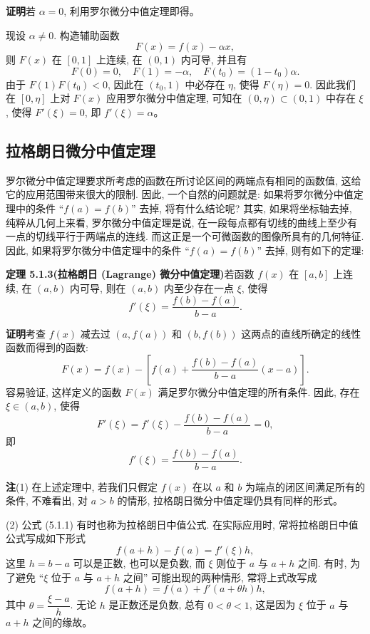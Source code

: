 \documentclass[UTF8, 12pt, fontset=fandol, oneside]{ctexart}
\begin{document}
\noindent\textbf{证明}\quad 若 $\alpha=0$, 利用罗尔微分中值定理即得。

现设 $\alpha\ne0$. 构造辅助函数
\[
  F(x)=f(x)-\alpha x,
\]
则 $F(x)$ 在 $[0,1]$ 上连续, 在 $(0,1)$ 内可导, 并且有
\[
  F(0)=0,\quad F(1)=-\alpha,\quad F(t_0)=(1-t_0)\alpha.
\]
由于 $F(1)F(t_0)<0$, 因此在 $(t_0,1)$ 中必存在 $\eta$, 使得 $F(\eta)=0$. 因此我们在 $[0,\eta]$ 上对 $F(x)$ 应用罗尔微分中值定理, 可知在 $(0,\eta)\subset(0,1)$ 中存在 $\xi$, 使得 $F'(\xi)=0$, 即 $f'(\xi)=\alpha$。

\subsection{拉格朗日微分中值定理}

罗尔微分中值定理要求所考虑的函数在所讨论区间的两端点有相同的函数值, 这给它的应用范围带来很大的限制. 因此, 一个自然的问题就是: 如果将罗尔微分中值定理中的条件 ``$f(a)=f(b)$'' 去掉, 将有什么结论呢? 其实, 如果将坐标轴去掉, 纯粹从几何上来看, 罗尔微分中值定理是说, 在一段每点都有切线的曲线上至少有一点的切线平行于两端点的连线. 而这正是一个可微函数的图像所具有的几何特征. 因此, 如果将罗尔微分中值定理中的条件 ``$f(a)=f(b)$'' 去掉, 则有如下的定理:

\noindent\textbf{定理 5.1.3(拉格朗日 (Lagrange) 微分中值定理)}\quad 若函数 $f(x)$ 在 $[a,b]$ 上连续, 在 $(a,b)$ 内可导, 则在 $(a,b)$ 内至少存在一点 $\xi$, 使得
\begin{equation}
  f'(\xi)=\frac{f(b)-f(a)}{b-a}.
  \tag{5.1.1}
\end{equation}

\noindent\textbf{证明}\quad 考查 $f(x)$ 减去过 $(a,f(a))$ 和 $(b,f(b))$ 这两点的直线所确定的线性函数而得到的函数:
\[
  F(x)=f(x)-\left[f(a)+\frac{f(b)-f(a)}{b-a}(x-a)\right].
\]
容易验证, 这样定义的函数 $F(x)$ 满足罗尔微分中值定理的所有条件. 因此, 存在 $\xi\in(a,b)$, 使得
\[
  F'(\xi)=f'(\xi)-\frac{f(b)-f(a)}{b-a}=0,
\]
即
\[
  f'(\xi)=\frac{f(b)-f(a)}{b-a}.
\]

\noindent\textbf{注}\quad (1) 在上述定理中, 若我们只假定 $f(x)$ 在以 $a$ 和 $b$ 为端点的闭区间满足所有的条件, 不难看出, 对 $a>b$ 的情形, 拉格朗日微分中值定理仍具有同样的形式。

(2) 公式 (5.1.1) 有时也称为拉格朗日中值公式. 在实际应用时, 常将拉格朗日中值公式写成如下形式
\[
  f(a+h)-f(a)=f'(\xi)h,
\]
这里 $h=b-a$ 可以是正数, 也可以是负数, 而 $\xi$ 则位于 $a$ 与 $a+h$ 之间. 有时, 为了避免 ``$\xi$ 位于 $a$ 与 $a+h$ 之间'' 可能出现的两种情形, 常将上式改写成
\[
  f(a+h)=f(a)+f'(a+\theta h)h,
\]
其中 $\theta=\dfrac{\xi-a}{h}$. 无论 $h$ 是正数还是负数, 总有 $0<\theta<1$, 这是因为 $\xi$ 位于 $a$ 与 $a+h$ 之间的缘故。
\end{document}
